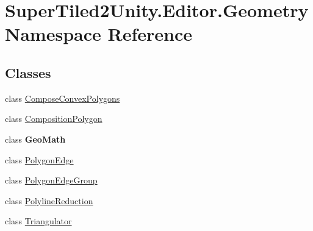 \hypertarget{namespace_super_tiled2_unity_1_1_editor_1_1_geometry}{}\section{Super\+Tiled2\+Unity.\+Editor.\+Geometry Namespace Reference}
\label{namespace_super_tiled2_unity_1_1_editor_1_1_geometry}
\subsection*{Classes}
\begin{DoxyCompactItemize}
\item 
class \mbox{\hyperlink{class_super_tiled2_unity_1_1_editor_1_1_geometry_1_1_compose_convex_polygons}{Compose\+Convex\+Polygons}}
\item 
class \mbox{\hyperlink{class_super_tiled2_unity_1_1_editor_1_1_geometry_1_1_composition_polygon}{Composition\+Polygon}}
\item 
class {\bfseries Geo\+Math}
\item 
class \mbox{\hyperlink{class_super_tiled2_unity_1_1_editor_1_1_geometry_1_1_polygon_edge}{Polygon\+Edge}}
\item 
class \mbox{\hyperlink{class_super_tiled2_unity_1_1_editor_1_1_geometry_1_1_polygon_edge_group}{Polygon\+Edge\+Group}}
\item 
class \mbox{\hyperlink{class_super_tiled2_unity_1_1_editor_1_1_geometry_1_1_polyline_reduction}{Polyline\+Reduction}}
\item 
class \mbox{\hyperlink{class_super_tiled2_unity_1_1_editor_1_1_geometry_1_1_triangulator}{Triangulator}}
\end{DoxyCompactItemize}
